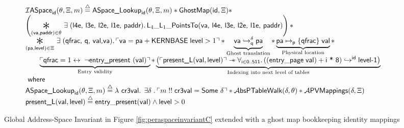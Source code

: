 \begin{figure*}
\footnotesize
\[
\begin{array}{l}
  \mathcal{I}\textsf{ASpace}_{\textsf{id}}(\ptablestore,\Xi,m)\stackrel{\triangle}{=} \textsf{ASpace\_Lookup}_{\textsf{id}}(\ptablestore,\Xi,m) \ast \mathsf{GhostMap}(\mathsf{id},\Xi)\ast\\
  \left(\bigast{(\vaddr, \textsf{paddr})\in \ptablestore}{\exists\;(\textsf{l4e, l3e, l2e, l1e, paddr})\ldotp \textsf{L}_{4}\_\textsf{L}_{1}\_\textsf{PointsTo}(\vaddr\textsf{, l4e, l3e, l2e, l1e, paddr})}\right)\ast \\
  \bigast{(\paddr,\mathsf{level}) \in \Xi}{\exists\; (\textsf{qfrac, q, val,}\vaddr) \ldotp \ulcorner \vaddr = \paddr + \textsf{KERNBASE} \; \textsf{level} > 1\urcorner \ast  \underbrace{\fracghostmaptoken{\delta}{\vaddr}{\paddr}{\qfrac} }_\text{Ghost translation} \ast \underbrace{\paddr \mapsto_{\mathsf{p}}\{\textsf{qfrac}\}\; \vale}_\text{Physical location}} \ast\\
   \qquad\underbrace{ \ulcorner \textsf{qfrac} = 1 \leftrightarrow \; \lnot\textsf{entry\_present }(\vale) \urcorner}_\text{Entry validity}\ast 
    \underbrace{\left(\ulcorner\textsf{present\_L}(\vale,\mathsf{level})\urcorner \wand \forall_{\textsf{i}\in\textsf{0..511}} \ldotp \ghostmaptoken{\textsf{id}}{((\mathsf{entry\_page}\;\vale) + \textsf{i * 8})}{\textsf{level-1}}\right)}_{\text{Indexing into next level of tables}} \\
  \textsf{ where } \\
   \textsf{ASpace\_Lookup}_{\textsf{id}}(\ptablestore,\Xi,m) \stackrel{\triangle}{=} \lambda\textsf{ cr3val} \ldotp \; \exists \gammaPred \; \ldotp \ulcorner m \; !!\; \textsf{cr3val} = \textsf{Some } \gammaPred \urcorner \ast
   \ptableabswalk{\delta,\ptablestore} \ast \pvmapping{\delta,\Xi}\\
  \textsf{present\_L}(\vale,\mathsf{level})\stackrel{\triangle}{=} \mathsf{entry\_present}(\vale)\land \mathsf{level} > 0
  
\end{array}
\]
\vspace{-1em}
\caption{Global Address-Space Invariant in Figure \ref{fig:peraspaceinvariantC} extended with a ghost map bookkeeping identity mappings }
  \label{fig:peraspaceinvariant_with_p2v_extensionC}
\vspace{-1em}
\end{figure*}

